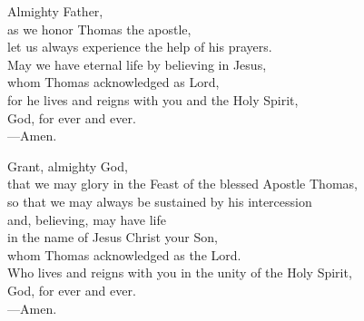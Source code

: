 \prayer


\begin{prayerverse}
Almighty Father,\\
as we honor Thomas the apostle,\\
let us always experience the help of his prayers.\\
May we have eternal life by believing in Jesus,\\
whom Thomas acknowledged as Lord,\\
for he lives and reigns with you and the Holy Spirit,\\
God, for ever and ever.\\
{\color{red}---\thinspace}Amen.
\end{prayerverse}


\begin{prayerverse}
Grant, almighty God,\\
that we may glory in the Feast of the blessed Apostle Thomas,\\
so that we may always be sustained by his intercession\\
and, believing, may have life\\
in the name of Jesus Christ your Son,\\
whom Thomas acknowledged as the Lord.\\
Who lives and reigns with you in the unity of the Holy Spirit,\\
God, for ever and ever.\\
{\color{red}---\thinspace}Amen.
\end{prayerverse}

